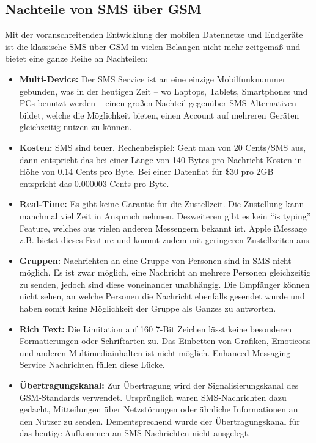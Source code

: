 \documentclass[german,12pt,a4paper]{article}
\begin{document}
\subsection{Nachteile von SMS über GSM}
Mit der voranschreitenden Entwicklung der mobilen Datennetze und Endgeräte ist die klassische SMS über GSM  in vielen Belangen
nicht mehr zeitgemäß und bietet eine ganze Reihe an Nachteilen:
\begin{itemize}
	\item \textbf{Multi-Device:} Der SMS Service ist an eine einzige Mobilfunknummer gebunden, was in der heutigen Zeit -- 
		wo Laptops, Tablets, Smartphones und PCs benutzt werden -- einen großen Nachteil gegenüber SMS Alternativen 
		bildet, welche die Möglichkeit bieten, einen Account auf mehreren Geräten gleichzeitig nutzen zu können.
	\item \textbf{Kosten:} SMS sind teuer. Rechenbeispiel: Geht man von 20 Cents/SMS aus, dann entspricht das bei einer Länge von 
        140 Bytes pro Nachricht Kosten in Höhe von 0.14 Cents pro Byte. Bei einer Datenflat für \$30 pro 2GB entspricht das 
        0.000003 Cents pro Byte.
	\item \textbf{Real-Time:} Es gibt keine Garantie für die Zustellzeit. Die Zustellung kann manchmal viel Zeit in Anspruch nehmen. 
		Desweiteren gibt es kein ``is typing'' Feature, welches aus vielen anderen Messengern bekannt ist. Apple iMessage z.B. bietet 
		dieses Feature und kommt zudem mit geringeren Zustellzeiten aus.
	\item \textbf{Gruppen:} Nachrichten an eine Gruppe von Personen sind in SMS nicht möglich. Es ist zwar möglich, eine Nachricht 
        an mehrere Personen gleichzeitig zu senden, jedoch sind diese voneinander unabhängig. Die Empfänger können nicht sehen, 
        an welche Personen die Nachricht ebenfalls gesendet wurde und haben somit keine Möglichkeit der Gruppe als Ganzes zu antworten.
	\item \textbf{Rich Text:} Die Limitation auf 160 7-Bit Zeichen lässt keine besonderen Formatierungen oder Schriftarten zu. 
        Das Einbetten von Grafiken, Emoticons und anderen Multimediainhalten ist nicht möglich. Enhanced Messaging Service Nachrichten 
        füllen diese Lücke.
	\item \textbf{Übertragungskanal:} Zur Übertragung wird der Signalisierungskanal des GSM-Standards verwendet. Ursprünglich waren 
        SMS-Nachrichten dazu gedacht, Mitteilungen über Netzstörungen oder ähnliche Informationen an den Nutzer zu senden. Dementsprechend 
        wurde der Übertragungskanal für das heutige Aufkommen an SMS-Nachrichten nicht ausgelegt.
\end{itemize}
\end{document}
